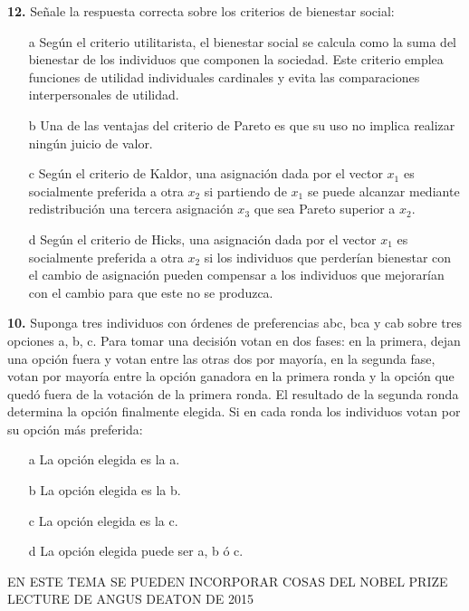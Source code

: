 \documentclass{nuevotema}
\begin{document}

\textbf{12.} Señale la respuesta correcta sobre los criterios de bienestar social:

\begin{itemize}
	\item[a] Según el criterio utilitarista, el bienestar social se calcula como la suma del bienestar de los individuos que componen la sociedad. Este criterio emplea funciones de utilidad individuales cardinales y evita las comparaciones interpersonales de utilidad. 
	\item[b] Una de las ventajas del criterio de Pareto es que su uso no implica realizar ningún juicio de valor.
	\item[c] Según el criterio de Kaldor, una asignación dada por el vector $x_1$ es socialmente preferida a otra $x_2$ si partiendo de $x_1$ se puede alcanzar mediante redistribución una tercera asignación $x_3$ que sea Pareto superior a $x_2$.
	\item[d] Según el criterio de Hicks, una asignación dada por el vector $x_1$ es socialmente preferida a otra $x_2$ si los individuos que perderían bienestar con el cambio de asignación pueden compensar a los individuos que mejorarían con el cambio para que este no se produzca.
\end{itemize}


\textbf{10.} Suponga tres individuos con órdenes de preferencias abc, bca y cab sobre tres opciones a, b, c. Para tomar una decisión votan en dos fases: en la primera, dejan una opción fuera y votan entre las otras dos por mayoría, en la segunda fase, votan por mayoría entre la opción ganadora en la primera ronda y la opción que quedó fuera de la votación de la primera ronda. El resultado de la segunda ronda determina la opción finalmente elegida. Si en cada ronda los individuos votan por su opción más preferida:

\begin{itemize}
	\item[a] La opción elegida es la a. 
	\item[b] La opción elegida es la b.
	\item[c] La opción elegida es la c.
	\item[d] La opción elegida puede ser a, b ó c.
\end{itemize}

\notas

EN ESTE TEMA SE PUEDEN INCORPORAR COSAS DEL NOBEL PRIZE LECTURE DE ANGUS DEATON DE 2015
\end{document}
